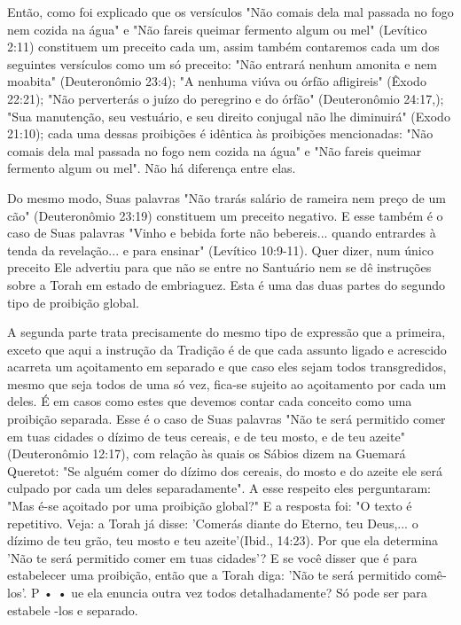 \begin{itemize}
\begin{enumrate}
Então, como foi explicado que os versículos "Não comais dela mal passada
no fogo nem cozida na água" e "Não fareis queimar fermento algum ou mel"
(Levítico 2:11) constituem um preceito cada um, assim também conta­remos
cada um dos seguintes versículos como um só preceito: "Não entrará
nenhum amonita e nem moabita" (Deuteronômio 23:4); "A nenhuma viúva ou
órfão afligireis" (Êxodo 22:21); "Não perverterás o juízo do peregrino e
do ór­fão" (Deuteronômio 24:17,); "Sua manutenção, seu vestuário, e seu
direito con­jugal não lhe diminuirá" (Exodo 21:10); cada uma dessas
proibições é idêntica às proibições mencionadas: "Não comais dela mal
passada no fogo nem cozida na água" e "Não fareis queimar fermento algum
ou mel". Não há diferença en­tre elas.

Do mesmo modo, Suas palavras "Não trarás salário de rameira nem preço de
um cão" (Deuteronômio 23:19) constituem um preceito negativo. E esse
também é o caso de Suas palavras "Vinho e bebida forte não bebereis...
quando entrardes à tenda da revelação... e para ensinar" (Levítico
10:9-11). Quer dizer, num único preceito Ele advertiu para que não se
entre no Santuário nem se dê instruções sobre a Torah em estado de
embriaguez. Esta é uma das duas partes do segundo tipo de proibição
global.

A segunda parte trata precisamente do mesmo tipo de expressão que a
primeira, exceto que aqui a instrução da Tradição é de que cada assunto
liga­do e acrescido acarreta um açoitamento em separado e que caso eles
sejam to­dos transgredidos, mesmo que seja todos de uma só vez, fica-se
sujeito ao açoi­tamento por cada um deles. É em casos como estes que
devemos contar cada conceito como uma proibição separada.
Esse é o caso de Suas palavras "Não te será permitido comer em tuas
cidades o dízimo de teus cereais, e de teu mosto, e de teu azeite"
(Deuteronô­mio 12:17), com relação às quais os Sábios dizem na Guemará
Queretot: "Se al­guém comer do dízimo dos cereais, do mosto e do azeite
ele será culpado por cada um deles separadamente". A esse respeito eles
perguntaram: "Mas é-se açoi­tado por uma proibição global?" E a resposta
foi: "O texto é repetitivo. Veja: a Torah já disse: 'Comerás diante do
Eterno, teu Deus,... o dízimo de teu grão, teu mosto e teu
azeite'(Ibid., 14:23). Por que ela determina 'Não te será permiti­do
comer em tuas cidades'? E se você disser que é para estabelecer uma
proibi­ção, então que a Torah diga: 'Não te será permitido comê-los'. P
• • ue ela enun­cia outra vez todos detalhadamente? Só pode ser para
estabele -los e separado.


\end{enumrate}
\end{itemize}

